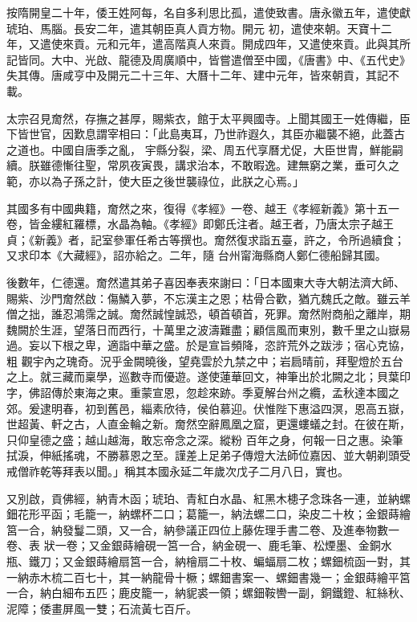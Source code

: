 \begin{pinyinscope}
 按隋開皇二十年，倭王姓阿每，名自多利思比孤，遣使致書。唐永徽五年，遣使獻琥珀、馬腦。長安二年，遣其朝臣真人貢方物。開元
 初，遣使來朝。天寶十二年，又遣使來貢。元和元年，遣高階真人來貢。開成四年，又遣使來貢。此與其所記皆同。大中、光啟、龍德及周廣順中，皆嘗遣僧至中國，《唐書》中、《五代史》失其傳。唐咸亨中及開元二十三年、大曆十二年、建中元年，皆來朝貢，其記不載。



 太宗召見奝然，存撫之甚厚，賜紫衣，館于太平興國寺。上聞其國王一姓傳繼，臣下皆世官，因歎息謂宰相曰：「此島夷耳，乃世祚遐久，其臣亦繼襲不絕，此蓋古之道也。中國自唐季之亂，
 宇縣分裂，梁、周五代享曆尤促，大臣世胄，鮮能嗣續。朕雖德慚往聖，常夙夜寅畏，講求治本，不敢暇逸。建無窮之業，垂可久之範，亦以為子孫之計，使大臣之後世襲祿位，此朕之心焉。」



 其國多有中國典籍，奝然之來，復得《孝經》一卷、越王《孝經新義》第十五一卷，皆金縷紅羅標，水晶為軸。《孝經》即鄭氏注者。越王者，乃唐太宗子越王貞；《新義》者，記室參軍任希古等撰也。奝然復求詣五臺，許之，令所過續食；又求印本《大藏經》，詔亦給之。二年，隨
 台州甯海縣商人鄭仁德船歸其國。



 後數年，仁德還。奝然遣其弟子喜因奉表來謝曰：「日本國東大寺大朝法濟大師、賜紫、沙門奝然啟：傷鱗入夢，不忘漢主之恩；枯骨合歡，猶亢魏氏之敵。雖云羊僧之拙，誰忍鴻霈之誠。奝然誠惶誠恐，頓首頓首，死罪。奝然附商船之離岸，期魏闕於生涯，望落日而西行，十萬里之波濤難盡；顧信風而東別，數千里之山嶽易過。妄以下根之卑，適詣中華之盛。於是宣旨頻降，恣許荒外之跋涉；宿心克協，粗
 觀宇內之瑰奇。況乎金闕曉後，望堯雲於九禁之中；岩扃晴前，拜聖燈於五台之上。就三藏而稟學，巡數寺而優遊。遂使蓮華回文，神筆出於北闕之北；貝葉印字，佛詔傳於東海之東。重蒙宣恩，忽趁來跡。季夏解台州之纜，孟秋達本國之郊。爰逮明春，初到舊邑，緇素欣待，侯伯慕迎。伏惟陛下惠溢四溟，恩高五嶽，世超黃、軒之古，人直金輪之新。奝然空辭鳳凰之窟，更還螻蟻之封。在彼在斯，只仰皇德之盛；越山越海，敢忘帝念之深。縱粉
 百年之身，何報一日之惠。染筆拭淚，伸紙搖魂，不勝慕恩之至。謹差上足弟子傳燈大法師位嘉因、並大朝剃頭受戒僧祚乾等拜表以聞。」稱其本國永延二年歲次戊子二月八日，實也。



 又別啟，貢佛經，納青木函；琥珀、青紅白水晶、紅黑木槵子念珠各一連，並納螺鈿花形平函；毛籠一，納螺杯二口；葛籠一，納法螺二口，染皮二十枚；金銀蒔繪筥一合，納發鬘二頭，又一合，納參議正四位上藤佐理手書二卷、及進奉物數一卷、表
 狀一卷；又金銀蒔繪硯一筥一合，納金硯一、鹿毛筆、松煙墨、金銅水瓶、鐵刀；又金銀蒔繪扇筥一合，納檜扇二十枚、蝙蝠扇二枚；螺鈿梳函一對，其一納赤木梳二百七十，其一納龍骨十橛；螺鈿書案一、螺鈿書幾一；金銀蒔繪平筥一合，納白細布五匹；鹿皮籠一，納䝚裘一領；螺鈿鞍轡一副，銅鐵鐙、紅絲秋、泥障；倭畫屏風一雙；石流黃七百斤。




\end{pinyinscope}
